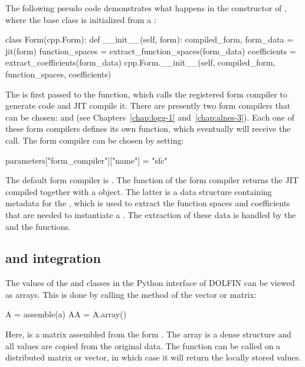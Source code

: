 The following pseudo code demonstrates what happens in the constructor
of , where the base class  is initialized
from a :
\begin{python}
class Form(cpp.Form):
    def __init__(self, form):
        compiled_form, form_data = jit(form)
        function_spaces = extract_function_spaces(form_data)
        coefficients = extract_coefficients(form_data)
        cpp.Form.__init__(self, compiled_form, function_spaces, coefficients)
\end{python}
The  is first passed to the  function,
which calls the registered form compiler to generate code and JIT
compile it. There are presently two form compilers that can be
chosen:  and  (see Chapters~\ref{chap:logg-1}
and~\ref{chap:alnes-3}). Each one of these form compilers defines its
own  function, which eventually will receive the call. The form
compiler can be chosen by setting:
\begin{python}
parameters["form_compiler"]["name"] = "sfc"
\end{python}
The default form compiler is . The  function of
the form compiler returns the JIT compiled  together
with a  object. The latter is a data structure
containing metadata for the , which is used to extract
the function spaces and coefficients that are needed to instantiate a
. The extraction of these data is handled by the
 and the 
functions.

\subsection{\numpy and \scipy integration}

The values of the  and  classes in the Python
interface of DOLFIN can be viewed as \numpy arrays. This is done by
calling the  method of the vector or matrix:
\begin{python}
A  = assemble(a)
AA = A.array()
\end{python}
Here,  is a matrix assembled from the form . The \numpy
array  is a dense structure and all values are copied from the
original data. The  function can be called on a distributed
matrix or vector, in which case it will return the locally stored
values.


